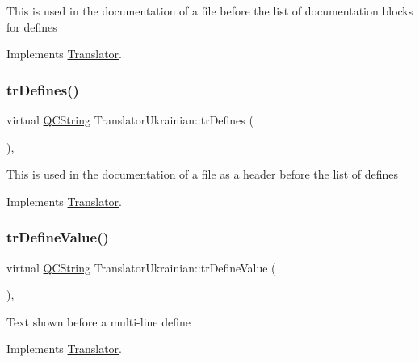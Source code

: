 This is used in the documentation of a file before the list of documentation blocks for defines 

Implements \mbox{\hyperlink{class_translator}{Translator}}.

\mbox{\label{class_translator_ukrainian_abd9c8145b368ef1fa3a8644a52c054d9}} 
\subsubsection{\texorpdfstring{trDefines()}{trDefines()}}
{\footnotesize\ttfamily virtual \mbox{\hyperlink{class_q_c_string}{Q\+C\+String}} Translator\+Ukrainian\+::tr\+Defines (\begin{DoxyParamCaption}{ }\end{DoxyParamCaption})\hspace{0.3cm}{\ttfamily [inline]}, {\ttfamily [virtual]}}

This is used in the documentation of a file as a header before the list of defines 

Implements \mbox{\hyperlink{class_translator}{Translator}}.

\mbox{\label{class_translator_ukrainian_a0432f83f36309bf615c42eb124e874a8}} 
\subsubsection{\texorpdfstring{trDefineValue()}{trDefineValue()}}
{\footnotesize\ttfamily virtual \mbox{\hyperlink{class_q_c_string}{Q\+C\+String}} Translator\+Ukrainian\+::tr\+Define\+Value (\begin{DoxyParamCaption}{ }\end{DoxyParamCaption})\hspace{0.3cm}{\ttfamily [inline]}, {\ttfamily [virtual]}}

Text shown before a multi-\/line define 

Implements \mbox{\hyperlink{class_translator}{Translator}}.

\mbox{\label{class_translator_ukrainian_a796200bfe1ff95e8e3fae4611a4dc254}} 
